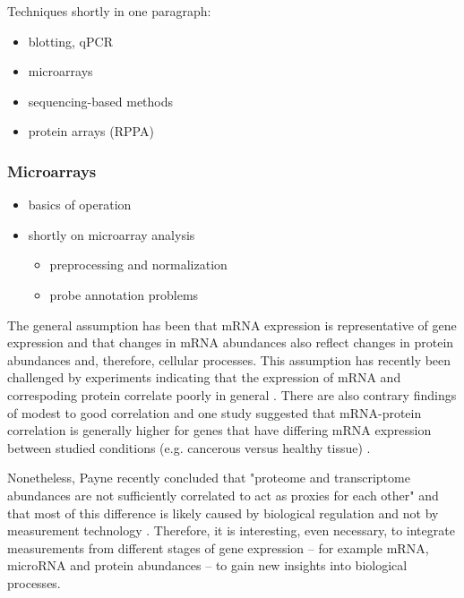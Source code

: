 Techniques shortly in one paragraph:
\begin{itemize}
  \item blotting, qPCR
  \item microarrays
  \item sequencing-based methods
  \item protein arrays (RPPA)
\end{itemize}


\subsubsection{Microarrays}

\begin{itemize}
  \item basics of operation
  \item shortly on microarray analysis
  \begin{itemize}
    \item preprocessing and normalization
    \item probe annotation problems
  \end{itemize}
\end{itemize}


The general assumption has been that mRNA expression is representative of gene
expression and that changes in mRNA abundances also reflect changes in protein
abundances and, therefore, cellular processes. This assumption has recently
been challenged by experiments indicating that the expression of mRNA and
correspoding protein correlate poorly in general \citep{tahanOliNiitaRefeja}.
There are also contrary findings of modest to good correlation
and one study suggested that mRNA-protein correlation is generally higher for
genes that have differing mRNA expression between studied conditions
(e.g. cancerous versus healthy tissue) \citep{seYksPaperi}.

Nonetheless, Payne recently concluded that "proteome and transcriptome abundances are not
sufficiently correlated to act as proxies for each other" and that
most of this difference is likely caused by biological regulation and not
by measurement technology \cite{Payne2015}.
Therefore, it is interesting, even necessary, to integrate
measurements from different stages of gene expression -- for example
mRNA, microRNA and protein abundances -- to gain new insights
into biological processes.




















